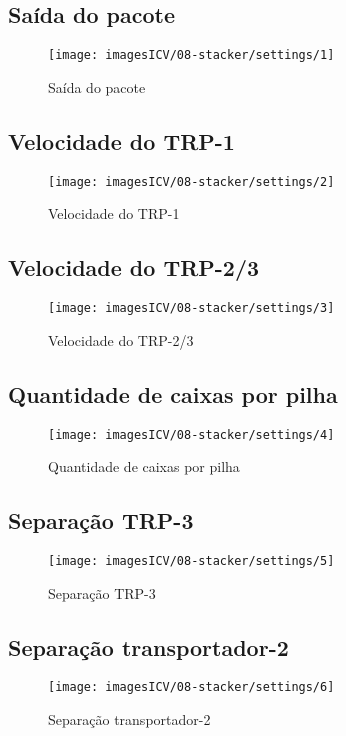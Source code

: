 \usepackage{graphicx}
\usepackage{wasysym}
\newpage
\thispagestyle{fancy}
\vspace{\fill}

\subsection{\small Saída do pacote}
\begin{figure}
    \centering
    \texttt{[image: imagesICV/08-stacker/settings/1]}
    \caption{Saída do pacote}
\end{figure}
\newpage

\thispagestyle{fancy}
\vspace{\fill}

\subsection{\small Velocidade do TRP-1}
\begin{figure}
    \centering
    \texttt{[image: imagesICV/08-stacker/settings/2]}
    \caption{Velocidade do TRP-1}
\end{figure}
\newpage

\thispagestyle{fancy}
\vspace{\fill}

\subsection{\small Velocidade do TRP-2/3}
\begin{figure}
    \centering
    \texttt{[image: imagesICV/08-stacker/settings/3]}
    \caption{Velocidade do TRP-2/3}
\end{figure}
\newpage

\thispagestyle{fancy}
\vspace{\fill}

\subsection{\small Quantidade de caixas por pilha}
\begin{figure}
    \centering
    \texttt{[image: imagesICV/08-stacker/settings/4]}
    \caption{Quantidade de caixas por pilha}
\end{figure}
\newpage

\thispagestyle{fancy}
\vspace{\fill}

\subsection{\small Separação TRP-3}
\begin{figure}
    \centering
    \texttt{[image: imagesICV/08-stacker/settings/5]}
    \caption{Separação TRP-3}
\end{figure}
\newpage

\thispagestyle{fancy}
\vspace{\fill}

\subsection{\small Separação transportador-2}
\begin{figure}
    \centering
    \texttt{[image: imagesICV/08-stacker/settings/6]}
    \caption{Separação transportador-2}
\end{figure}

